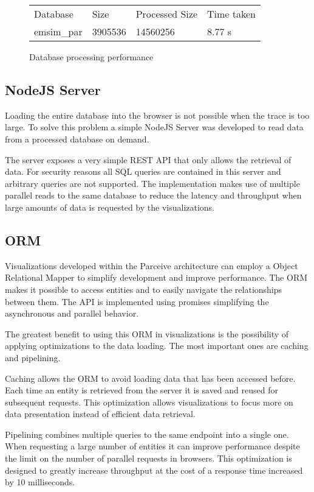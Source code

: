 \documentclass[conference]{IEEEtran}
\begin{document}
\begin{figure}
	\centering
	\begin{tabular}{l l l l}
		Database & Size & Processed Size & Time taken \\
		emsim\_par & 3905536 & 14560256 & 8.77 s
	\end{tabular}
	\caption{Database processing performance}
	\label{parceive:procperformance}
\end{figure}

\subsection{NodeJS Server}

Loading the entire database into the browser is not possible when the trace is too large. To solve this problem a simple NodeJS Server was developed to read data from a processed database on demand.

The server exposes a very simple REST \cite{rest} API that only allows the retrieval of data. For security reasons all SQL queries are contained in this server and  arbitrary queries are not supported. The implementation makes use of multiple parallel reads to the same database to reduce the latency and throughput when large amounts of data is requested by the visualizations.

\subsection{ORM}

Visualizations developed within the Parceive architecture can employ a Object Relational Mapper to simplify development and improve performance. The ORM makes it possible to access entities and to easily navigate the relationships between them. The API is implemented using promises \cite{promises} simplifying the asynchronous and parallel behavior.

The greatest benefit to using this ORM in visualizations is the possibility of applying optimizations to the data loading. The most important ones are caching and pipelining.

Caching allows the ORM to avoid loading data that has been accessed before. Each time an entity is retrieved from the server it is saved and reused for subsequent requests. This optimization allows visualizations to focus more on data presentation instead of efficient data retrieval.

Pipelining combines multiple queries to the same endpoint into a single one. When requesting a large number of entities it can improve performance despite the limit on the number of parallel requests in browsers. This optimization is designed to greatly increase throughput at the cost of a response time increased by 10 milliseconds.
\end{document}
